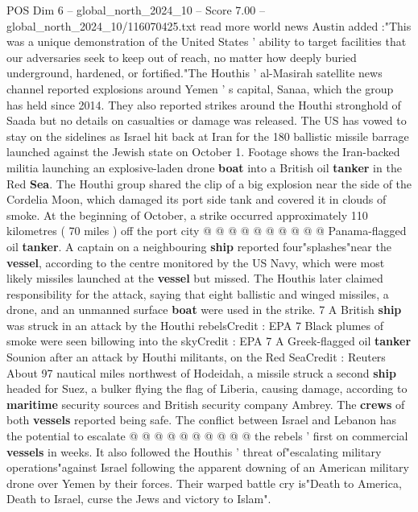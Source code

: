 \begin{textsample}{POS Dim 6 – global\_north\_2024\_10 – Score 7.00 – global\_north\_2024\_10/116070425.txt}  \label{ex:f6_pos_371}
read more world news Austin added :"This was a unique demonstration of the United States ' ability to target facilities that our adversaries seek to keep out of reach, no matter how deeply buried underground, hardened, or fortified."The Houthis ' al-Masirah satellite news channel reported explosions around Yemen ' s capital, Sanaa, which the group has held since 2014.
They also reported strikes around the Houthi stronghold of Saada but no details on casualties or damage was released.
The US has vowed to stay on the sidelines as Israel hit back at Iran for the 180 ballistic missile barrage launched against the Jewish state on October 1.
Footage shows the Iran-backed militia launching an explosive-laden drone \textbf{boat} into a British oil \textbf{tanker} in the Red \textbf{Sea}.
The Houthi group shared the clip of a big explosion near the side of the Cordelia Moon, which damaged its port side tank and covered it in clouds of smoke.
At the beginning of October, a strike occurred approximately 110 kilometres ( 70 miles ) off the port city @ @ @ @ @ @ @ @ @ @ Panama-flagged oil \textbf{tanker}.
A captain on a neighbouring \textbf{ship} reported four"splashes"near the \textbf{vessel}, according to the centre monitored by the US Navy, which were most likely missiles launched at the \textbf{vessel} but missed.
The Houthis later claimed responsibility for the attack, saying that eight ballistic and winged missiles, a drone, and an unmanned surface \textbf{boat} were used in the strike. 7 A British \textbf{ship} was struck in an attack by the Houthi rebelsCredit : EPA 7 Black plumes of smoke were seen billowing into the skyCredit : EPA 7 A Greek-flagged oil \textbf{tanker} Sounion after an attack by Houthi militants, on the Red SeaCredit : Reuters About 97 nautical miles northwest of Hodeidah, a missile struck a second \textbf{ship} headed for Suez, a bulker flying the flag of Liberia, causing damage, according to \textbf{maritime} security sources and British security company Ambrey.
The \textbf{crews} of both \textbf{vessels} reported being safe.
The conflict between Israel and Lebanon has the potential to escalate @ @ @ @ @ @ @ @ @ @ the rebels ' first on commercial \textbf{vessels} in weeks.
It also followed the Houthis ' threat of"escalating military operations"against Israel following the apparent downing of an American military drone over Yemen by their forces.
Their warped battle cry is"Death to America, Death to Israel, curse the Jews and victory to Islam".

\end{textsample}
